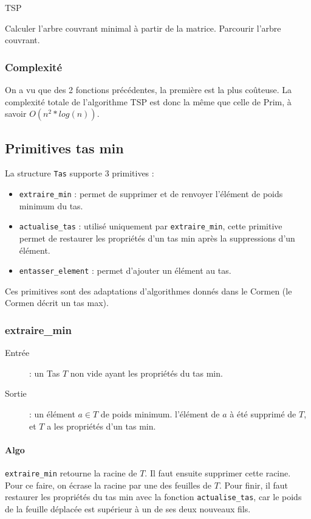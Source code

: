 \documentclass[a4paper,11pt]{article}
\begin{document}
\begin{algorithm}
\caption{TSP}
\begin{algorithmic}[1]

\STATE Calculer l'arbre couvrant minimal à partir de la matrice.
\STATE Parcourir l'arbre couvrant.

\end{algorithmic}
\end{algorithm}

\subsubsection*{Complexité}
On a vu que des 2 fonctions précédentes, la première est la plus coûteuse.
La complexité totale de l'algorithme TSP est donc la même que celle de Prim, à savoir $O(n^2*log(n))$.

\subsection{Primitives tas min} %
La structure \texttt{Tas} supporte 3 primitives :
\begin{itemize}
\item \texttt{extraire\_min} : permet de supprimer et de renvoyer l’élément de poids minimum du tas.
\item \texttt{actualise\_tas} : utilisé uniquement par \texttt{extraire\_min}, cette primitive permet de restaurer les propriétés d'un tas min après la suppressions d'un élément.
\item \texttt{entasser\_element} : permet d'ajouter un élément au tas.
\end{itemize}
Ces primitives sont des adaptations d'algorithmes donnés dans le Cormen (le Cormen décrit un tas max).
\subsubsection*{extraire\_min}
\begin{description}
\item[Entrée] : un \textsf{Tas} $T$ non vide ayant les propriétés du tas min.
\item[Sortie] : un élément $a \in T$ de poids minimum. l'élément de $a$ à été supprimé de $T$, et $T$ a les propriétés d'un tas min.
\end{description}
\paragraph*{Algo}
\texttt{extraire\_min} retourne la racine de $T$. Il faut ensuite supprimer cette racine. Pour ce faire, on écrase la racine par une des feuilles de $T$. Pour finir, il faut restaurer les propriétés du tas min avec la fonction \texttt{actualise\_tas}, car le poids de la feuille déplacée est supérieur à un de ses deux nouveaux fils.
\end{document}
